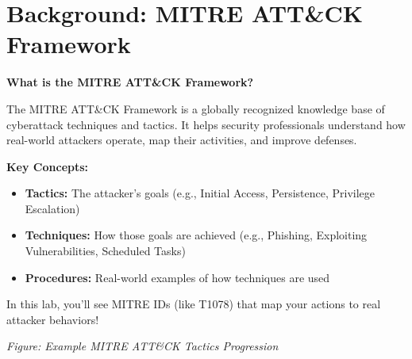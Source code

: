 \documentclass[12pt]{scrartcl}
\newenvironment{hintbox}{%
    \def\FrameCommand{\fboxsep=\FrameSep\colorbox{hintgreen!20}}%
    \MakeFramed {\advance\hsize-\width \FrameRestore}}%
    {\endMakeFramed}
\begin{document}
    \newpage

    \section{Background: MITRE ATT\&CK Framework}

    \begin{hintbox}
    \textbf{What is the MITRE ATT\&CK Framework?}

    The MITRE ATT\&CK Framework is a globally recognized knowledge base of cyberattack techniques and tactics. It helps security professionals understand how real-world attackers operate, map their activities, and improve defenses.

    \textbf{Key Concepts:}
    \begin{itemize}
        \item \textbf{Tactics:} The attacker's goals (e.g., Initial Access, Persistence, Privilege Escalation)
        \item \textbf{Techniques:} How those goals are achieved (e.g., Phishing, Exploiting Vulnerabilities, Scheduled Tasks)
        \item \textbf{Procedures:} Real-world examples of how techniques are used
    \end{itemize}

    In this lab, you'll see MITRE IDs (like T1078) that map your actions to real attacker behaviors!
    \end{hintbox}

    \begin{center}

    \small{\textit{Figure: Example MITRE ATT\&CK Tactics Progression}}
    \end{center}

    \vspace{1em}
\end{document}
